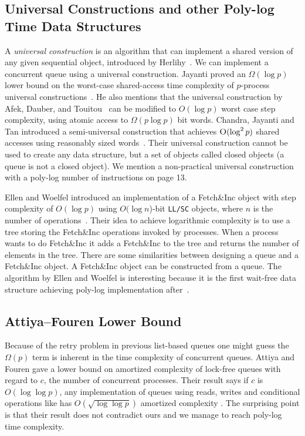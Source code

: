 \documentclass[10pt]{article}
\newcommand{\nf}[1]{{\normalfont{\texttt{#1}}}}
\theoremstyle{definition}
\begin{document}
\subsection{Universal Constructions and other Poly-log Time Data Structures}
A \textit{universal construction} is an algorithm that can implement a shared version of any given sequential object, introduced by Herlihy~\cite{10.1145/114005.102808}. We can implement a concurrent queue using a universal construction. Jayanti proved an $\Omega(\log p)$ lower bound on the worst-case shared-access time complexity of $p$-process universal constructions~\cite{DBLP:conf/podc/Jayanti98a}. He also mentions that the universal construction by Afek, Dauber, and Touitou~\cite{DBLP:conf/stoc/AfekDT95} can be modified to $O(\log p)$ worst case step complexity, using atomic access to $\Omega(p \log p)$ bit words. Chandra, Jayanti and Tan  introduced a semi-universal construction that achieves $\textsc{O}(\log^2 p)$ shared accesses using reasonably sized words~\cite{DBLP:conf/podc/ChandraJT98}. Their universal construction cannot be used to create any data structure, but a set of objects called closed objects (a queue is not a closed object). We mention a non-practical universal construction with a poly-log number of \nf{CAS} instructions on page 13.


Ellen and Woelfel introduced an implementation of a Fetch\&Inc object with step complexity of $O(\log p)$ using $O(\log n$)-bit \texttt{LL/SC} objects, where $n$ is the number of operations~\cite{10.1007/978-3-642-41527-2_20}. Their idea to achieve logarithmic complexity is to use a tree storing the Fetch\&Inc operations invoked by processes. When a process wants to do Fetch\&Inc it adds a Fetch\&Inc to the tree and returns the number of elements in the tree. There are some similarities between designing a queue and a Fetch\&Inc object. A Fetch\&Inc object can be constructed from a queue. The algorithm by Ellen and Woelfel is interesting because it is the first wait-free data structure achieving poly-log implementation after~\cite{DBLP:conf/podc/ChandraJT98}.

\subsection{Attiya--Fouren Lower Bound}
Because of the \nf{CAS} retry problem in previous list-based queues one might guess the $\Omega(p)$ term is inherent in the time complexity of concurrent queues. Attiya and Fouren gave a lower bound on amortized complexity of lock-free queues with regard to $c$, the number of concurrent processes. Their result says if $c$ is $O(\log\log p)$, any implementation of queues using reads, writes and conditional operations like \nf{CAS} has $O(\sqrt{\log \log p})$ amortized complexity \cite{DBLP:conf/opodis/AttiyaF17}. The surprising point is that their result does not contradict ours and we manage to reach poly-log time complexity.
\end{document}
